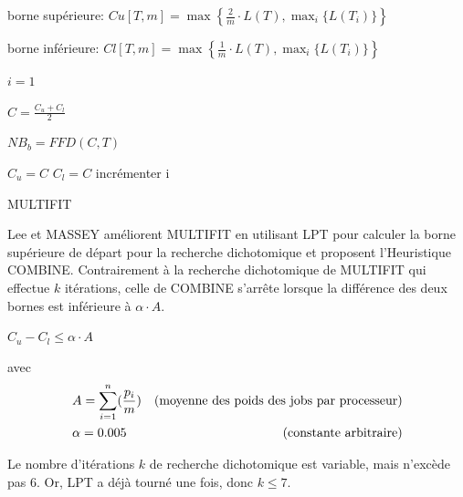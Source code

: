 \documentclass[a4paper,12pt]{report}
\theoremstyle{plain}				%
\theoremstyle{definition}				%
\begin{document}
\bigskip
\begin{algorithm}[H]
\DontPrintSemicolon
{}

\BlankLine %
borne supérieure: 
$Cu[T,m] = \max\left\{\frac{2}{m} \cdot L(T), \max_i\{L(T_i)\} \right\}$

borne inférieure: 
$Cl[T,m] = \max\left\{\frac{1}{m} \cdot L(T), \max_i\{L(T_i)\} \right\}$

\BlankLine %
$i=1$

 {
	$C = \frac{C_u + C_l}{2}$
	
	$NB_b = FFD(C, T)$ 
	
	 {
		$C_u = C$
	}
	\Sinon
	{
	 	$C_l = C$
	}
	incrémenter i
}
\BlankLine %


\caption{MULTIFIT}
\label{algo:MULTIFIT}
\end{algorithm}


\bigskip
Lee et MASSEY \cite{lee1988multiprocessor} améliorent MULTIFIT 
  en utilisant LPT pour 
  calculer la borne supérieure de départ 
  pour la recherche dichotomique 
  et proposent l'Heuristique COMBINE. 
Contrairement à la recherche dichotomique de MULTIFIT 
  qui effectue $k$ itérations, 
  celle de COMBINE s'arrête lorsque 
  la différence des deux bornes est inférieure à $\alpha \cdot A$.
  
$C_u - C_l \leq \alpha \cdot A$

avec  
\begin{align*}
&A = \sum_{i=1}^{n}(\frac{p_i}{m})	
&\textnormal{(moyenne des poids des jobs par processeur)} \\
&\alpha = 0.005 						
&\textnormal{(constante arbitraire)}
\end{align*}

Le nombre d’itérations $k$ de recherche dichotomique est variable, 
  mais n’excède pas 6. 
  Or, LPT a déjà tourné une fois, donc $k \leq 7$.
  
\end{document}
